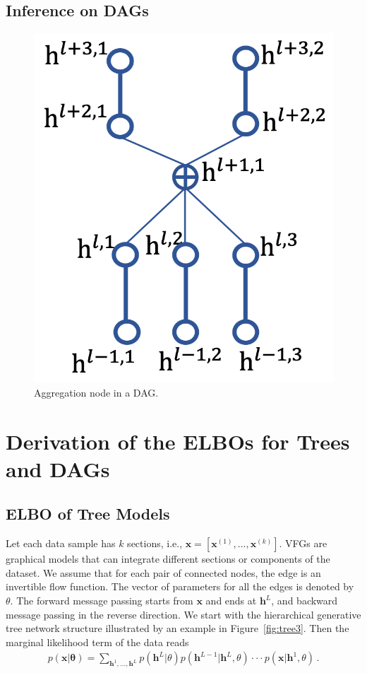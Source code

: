 \documentclass{article}
\begin{document}
\subsection{Inference on DAGs}
\begin{figure}[H]
\begin{center}
 \includegraphics[width=0.25\linewidth]{fig/dag_aggr.png}
\end{center}
\vspace{-0.2in}
\caption{ {\small  Aggregation node in a DAG.}}
\label{fig:dag_aggr}
\vspace{-0.15in}
\end{figure}




\section{Derivation of the ELBOs for  Trees and DAGs }
\subsection{ELBO of Tree Models}\label{appd:tree_elbo}

Let each data sample has $k$ sections, i.e., $\mathbf{x} = [\mathbf{x}^{(1)}, ..., \mathbf{x}^{(k)}]$. VFGs are graphical models that can integrate different sections or components of the dataset.  We assume that for each pair of connected nodes, the edge is an invertible flow function. 
The vector of parameters for all the edges is denoted by $\theta$. 
The forward message passing starts from $\mathbf{x}$ and ends at $\mathbf{h}^L$, and backward message passing in the reverse direction. We start with the hierarchical generative tree network structure illustrated by an example in Figure~\ref{fig:tree3}. 
Then the marginal likelihood term of the data reads
\begin{align*}
p(\mathbf{x}| \mathbf{\theta}) = \sum_{\mathbf{h}^1, ..., \mathbf{h}^L} p(\mathbf{h}^L | \theta)p(\mathbf{h}^{L-1} | \mathbf{h}^{L},\theta) \cdot \cdot  \cdot  p(\mathbf{x} | \mathbf{h}^{1}, \theta) \, .
\end{align*}
\end{document}
